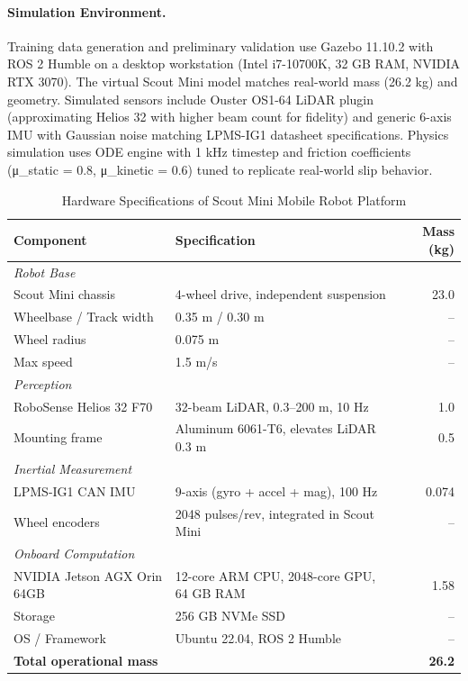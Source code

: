 \documentclass[pdflatex,sn-nature]{sn-jnl}%
\begin{document}
\paragraph{Simulation Environment.}
Training data generation and preliminary validation use Gazebo 11.10.2 with ROS 2 Humble on a desktop workstation (Intel i7-10700K, 32 GB RAM, NVIDIA RTX 3070). The virtual Scout Mini model matches real-world mass (26.2 kg) and geometry. Simulated sensors include Ouster OS1-64 LiDAR plugin (approximating Helios 32 with higher beam count for fidelity) and generic 6-axis IMU with Gaussian noise matching LPMS-IG1 datasheet specifications. Physics simulation uses ODE engine with 1 kHz timestep and friction coefficients (μ\_static = 0.8, μ\_kinetic = 0.6) tuned to replicate real-world slip behavior.

\begin{table}[htbp]
\centering
\caption{Hardware Specifications of Scout Mini Mobile Robot Platform}
\label{tab:hardware_specs}
\small
\begin{tabular}{@{}llr@{}}
\toprule
\textbf{Component} & \textbf{Specification} & \textbf{Mass (kg)} \\
\midrule
\multicolumn{3}{l}{\textit{Robot Base}} \\
\quad Scout Mini chassis & 4-wheel drive, independent suspension & 23.0 \\
\quad Wheelbase / Track width & 0.35 m / 0.30 m & -- \\
\quad Wheel radius & 0.075 m & -- \\
\quad Max speed & 1.5 m/s & -- \\
\midrule
\multicolumn{3}{l}{\textit{Perception}} \\
\quad RoboSense Helios 32 F70 & 32-beam LiDAR, 0.3--200 m, 10 Hz & 1.0 \\
\quad Mounting frame & Aluminum 6061-T6, elevates LiDAR 0.3 m & 0.5 \\
\midrule
\multicolumn{3}{l}{\textit{Inertial Measurement}} \\
\quad LPMS-IG1 CAN IMU & 9-axis (gyro + accel + mag), 100 Hz & 0.074 \\
\quad Wheel encoders & 2048 pulses/rev, integrated in Scout Mini & -- \\
\midrule
\multicolumn{3}{l}{\textit{Onboard Computation}} \\
\quad NVIDIA Jetson AGX Orin 64GB & 12-core ARM CPU, 2048-core GPU, 64 GB RAM & 1.58 \\
\quad Storage & 256 GB NVMe SSD & -- \\
\quad OS / Framework & Ubuntu 22.04, ROS 2 Humble & -- \\
\midrule
\textbf{Total operational mass} & & \textbf{26.2} \\
\bottomrule
\end{tabular}
\end{table}
\end{document}
